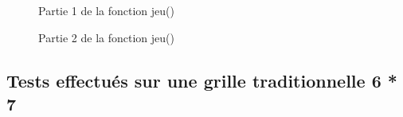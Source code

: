 \documentclass[a4paper]{article}
\begin{document}
\begin{figure}[h!]
      \centering 
      \caption{Partie 1 de la fonction jeu()}
\end{figure}

\newpage

\begin{figure}[h!]
      \centering 
      \caption{Partie 2 de la fonction jeu()}

\end{figure}



\subsection{Tests effectués sur une grille traditionnelle 6 * 7}
\end{document}
